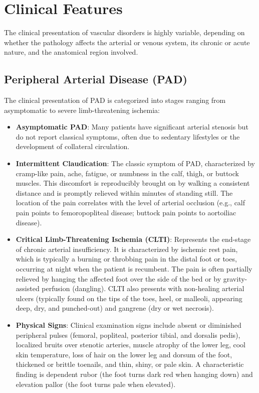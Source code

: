 \section*{Clinical Features}
The clinical presentation of vascular disorders is highly variable, depending on whether the pathology affects the arterial or venous system, its chronic or acute nature, and the anatomical region involved.

\subsection*{Peripheral Arterial Disease (PAD)}
The clinical presentation of PAD is categorized into stages ranging from asymptomatic to severe limb-threatening ischemia:
\begin{itemize}
    \item \textbf{Asymptomatic PAD}: Many patients have significant arterial stenosis but do not report classical symptoms, often due to sedentary lifestyles or the development of collateral circulation.
    \item \textbf{Intermittent Claudication}: The classic symptom of PAD, characterized by cramp-like pain, ache, fatigue, or numbness in the calf, thigh, or buttock muscles. This discomfort is reproducibly brought on by walking a consistent distance and is promptly relieved within minutes of standing still. The location of the pain correlates with the level of arterial occlusion (e.g., calf pain points to femoropopliteal disease; buttock pain points to aortoiliac disease).
    \item \textbf{Critical Limb-Threatening Ischemia (CLTI)}: Represents the end-stage of chronic arterial insufficiency. It is characterized by ischemic rest pain, which is typically a burning or throbbing pain in the distal foot or toes, occurring at night when the patient is recumbent. The pain is often partially relieved by hanging the affected foot over the side of the bed or by gravity-assisted perfusion (dangling). CLTI also presents with non-healing arterial ulcers (typically found on the tips of the toes, heel, or malleoli, appearing deep, dry, and punched-out) and gangrene (dry or wet necrosis).
    \item \textbf{Physical Signs}: Clinical examination signs include absent or diminished peripheral pulses (femoral, popliteal, posterior tibial, and dorsalis pedis), localized bruits over stenotic arteries, muscle atrophy of the lower leg, cool skin temperature, loss of hair on the lower leg and dorsum of the foot, thickened or brittle toenails, and thin, shiny, or pale skin. A characteristic finding is dependent rubor (the foot turns dark red when hanging down) and elevation pallor (the foot turns pale when elevated).
\end{itemize}

